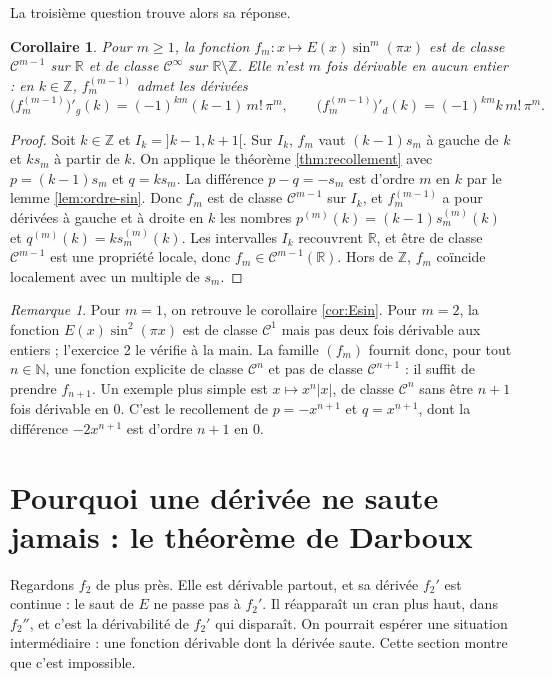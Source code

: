 \documentclass[11pt,a4paper]{article}
\theoremstyle{plain}
\newtheorem{corollaire}[theoreme]{Corollaire}
\theoremstyle{definition}
\theoremstyle{remark}
\newtheorem{remarque}[theoreme]{Remarque}
\newcommand{\N}{\mathbb{N}}
\newcommand{\Z}{\mathbb{Z}}
\newcommand{\R}{\mathbb{R}}
\newcommand{\Cc}{\mathcal{C}}
\newcommand{\1}{\mathbf{1}}
\begin{document}
La troisième question trouve alors sa réponse.

\begin{corollaire}\label{cor:fm}
Pour $m\geq1$, la fonction $f_m\colon x\mapsto E(x)\sin^m(\pi x)$ est de classe $\Cc^{m-1}$ sur $\R$ et de classe $\Cc^\infty$ sur $\R\setminus\Z$. Elle n'est $m$ fois dérivable en aucun entier : en $k\in\Z$, $f_m^{(m-1)}$ admet les dérivées
\[
  \big(f_m^{(m-1)}\big)'_g(k)=(-1)^{km}(k-1)\,m!\,\pi^m, \qquad \big(f_m^{(m-1)}\big)'_d(k)=(-1)^{km}k\,m!\,\pi^m .
\]
\end{corollaire}

\begin{proof}
Soit $k\in\Z$ et $I_k=]k-1,k+1[$. Sur $I_k$, $f_m$ vaut $(k-1)s_m$ à gauche de $k$ et $ks_m$ à partir de $k$. On applique le théorème \ref{thm:recollement} avec $p=(k-1)s_m$ et $q=ks_m$. La différence $p-q=-s_m$ est d'ordre $m$ en $k$ par le lemme \ref{lem:ordre-sin}. Donc $f_m$ est de classe $\Cc^{m-1}$ sur $I_k$, et $f_m^{(m-1)}$ a pour dérivées à gauche et à droite en $k$ les nombres $p^{(m)}(k)=(k-1)s_m^{(m)}(k)$ et $q^{(m)}(k)=ks_m^{(m)}(k)$. Les intervalles $I_k$ recouvrent $\R$, et être de classe $\Cc^{m-1}$ est une propriété locale, donc $f_m\in\Cc^{m-1}(\R)$. Hors de $\Z$, $f_m$ coïncide localement avec un multiple de $s_m$.
\end{proof}

\begin{remarque}
Pour $m=1$, on retrouve le corollaire \ref{cor:Esin}. Pour $m=2$, la fonction $E(x)\sin^2(\pi x)$ est de classe $\Cc^1$ mais pas deux fois dérivable aux entiers ; l'exercice 2 le vérifie à la main. La famille $(f_m)$ fournit donc, pour tout $n\in\N$, une fonction explicite de classe $\Cc^n$ et pas de classe $\Cc^{n+1}$ : il suffit de prendre $f_{n+1}$. Un exemple plus simple est $x\mapsto x^{n}|x|$, de classe $\Cc^n$ sans être $n+1$ fois dérivable en $0$. C'est le recollement de $p=-x^{n+1}$ et $q=x^{n+1}$, dont la différence $-2x^{n+1}$ est d'ordre $n+1$ en $0$.
\end{remarque}

\section{Pourquoi une dérivée ne saute jamais : le théorème de Darboux}

Regardons $f_2$ de plus près. Elle est dérivable partout, et sa dérivée $f_2'$ est continue : le saut de $E$ ne passe pas à $f_2'$. Il réapparaît un cran plus haut, dans $f_2''$, et c'est la dérivabilité de $f_2'$ qui disparaît. On pourrait espérer une situation intermédiaire : une fonction dérivable dont la dérivée saute. Cette section montre que c'est impossible.
\end{document}
